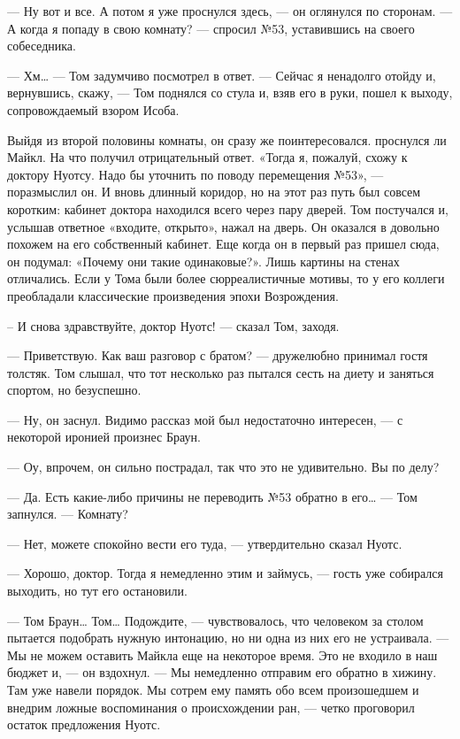— Ну вот и все. А потом я уже проснулся здесь, — он оглянулся по сторонам. — А когда я попаду в свою комнату? — спросил №53, уставившись на своего собеседника.

— Хм… — Том задумчиво посмотрел в ответ. — Сейчас я ненадолго отойду и, вернувшись, скажу, — Том поднялся со стула и, взяв его в руки, пошел к выходу, сопровождаемый взором Исоба.

Выйдя из второй половины комнаты, он сразу же поинтересовался. проснулся ли Майкл. На что получил отрицательный ответ. «Тогда я, пожалуй, схожу к доктору Нуотсу. Надо бы уточнить по поводу перемещения №53», — поразмыслил он. И вновь длинный коридор, но на этот раз путь был совсем коротким: кабинет доктора находился всего через пару дверей. Том постучался и, услышав ответное «входите, открыто», нажал на дверь. Он оказался в довольно похожем на его собственный кабинет. Еще когда он в первый раз пришел сюда, он подумал: «Почему они такие одинаковые?». Лишь картины на стенах отличались. Если у Тома были более сюрреалистичные мотивы, то у его коллеги преобладали классические произведения эпохи Возрождения.

– И снова здравствуйте, доктор Нуотс! — сказал Том, заходя.

— Приветствую. Как ваш разговор с братом? — дружелюбно принимал гостя толстяк. Том слышал, что тот несколько раз пытался сесть на диету и заняться спортом, но безуспешно.

— Ну, он заснул. Видимо рассказ мой был недостаточно интересен, — с некоторой иронией произнес Браун.

— Оу, впрочем, он сильно пострадал, так что это не удивительно. Вы по делу?

— Да. Есть какие-либо причины не переводить №53 обратно в его… — Том запнулся. — Комнату?

— Нет, можете спокойно вести его туда, — утвердительно сказал Нуотс.

— Хорошо, доктор. Тогда я немедленно этим и займусь, — гость уже собирался выходить, но тут его остановили.

— Том Браун… Том… Подождите, — чувствовалось, что человеком за столом пытается подобрать нужную интонацию, но ни одна из них его не устраивала. — Мы не можем оставить Майкла еще на некоторое время. Это не входило в наш бюджет и, — он вздохнул. — Мы немедленно отправим его обратно в хижину. Там уже навели порядок. Мы сотрем ему память обо всем произошедшем и внедрим ложные воспоминания о происхождении ран, — четко проговорил остаток предложения Нуотс.

